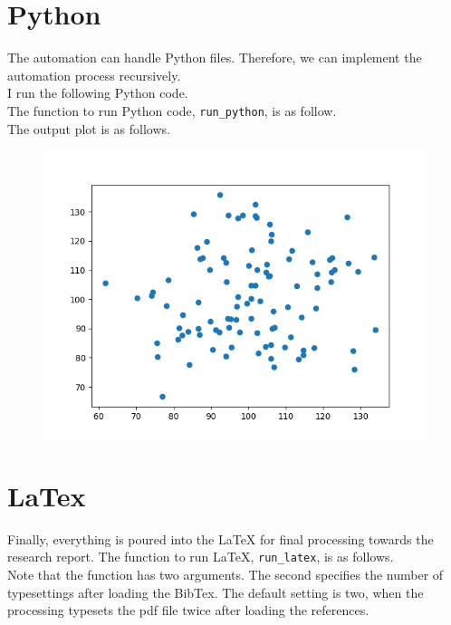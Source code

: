 \documentclass[12pt, a4paper]{article}
\begin{document}
\section{Python}

The automation can handle Python files. Therefore, we can implement the automation process recursively.\\

I run the following Python code.\\



The function to run Python code, \texttt{run\_python}, is as follow.\\



The output plot is as follows.\\

\begin{figure}[H]
	\includegraphics[width=.5\textwidth]{sample_python_graph.png}
\end{figure}

\section{LaTex}

Finally, everything is poured into the LaTeX for final processing towards the research report. The function to run LaTeX, \texttt{run\_latex}, is as follows.\\



Note that the function has two arguments. The second specifies the number of typesettings after loading the BibTex. The default setting is two, when the processing typesets the pdf file twice after loading the references.\\
\end{document}
